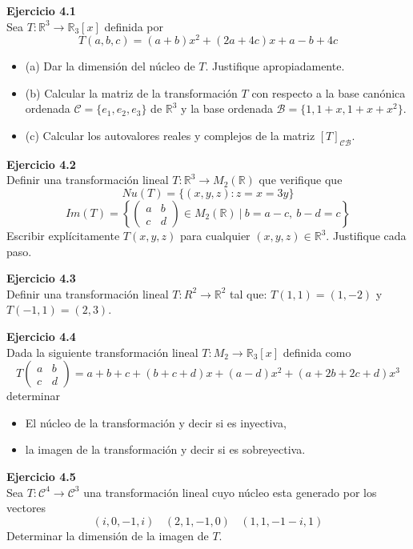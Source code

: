 \documentclass{article}
\newenvironment{problem}[2][Ejercicio]
    { \begin{mdframed}[backgroundcolor=gray!20] \textbf{#1 #2} \\}
    {  \end{mdframed}}
\begin{document}
\begin{problem}{4.1}
    Sea $T : \mathbb{R}^3 \to \mathbb{R}_3[x]$ definida por
\[
T(a,b,c) = (a+b)x^2+(2a+4c)x+a-b+4c
\]\begin{itemize}
\item 
(a) Dar la dimensión del núcleo de $T$. Justifique apropiadamente.
\item 
(b) Calcular la matriz de la transformación $T$ con respecto a la base canónica ordenada $\mathcal{C}= \{ e_1,e_2,e_3\}$ de $\mathbb{R}^3$ y la base ordenada $\mathcal{B} = \{1,1+x,1+x+x^2\}$.
\item 
(c) Calcular los autovalores reales y complejos de la matriz $[T]_{\mathcal{CB}}$.
\end{itemize}
\end{problem}
\begin{problem}{4.2}
    Definir una transformación lineal $T:\mathbb{R}^3 \to M_2(\mathbb{R})$ que verifique que
\[
Nu(T) = \{ (x,y,z) : z = x = 3y \}
\]\[
Im(T) = \left \{  \begin{pmatrix} a & b \\ c & d \end{pmatrix}  \in M_2(\mathbb{R}) \ | \ b=a-c, \ b-d = c \right \}
\]
Escribir explícitamente $T(x,y,z)$ para cualquier $(x,y,z) \in \mathbb{R}^3$. Justifique cada paso.
\end{problem}
\begin{problem}{4.3}
    Definir una transformación lineal $T : R^2 \to \mathbb{R}^2$ tal que: $T(1, 1) = (1, -2)$ y $T(-1, 1) = (2, 3)$.
\end{problem}

\begin{problem}{4.4}
    Dada la siguiente transformación lineal $T : M_2 \to \mathbb{R}_3[x]$ definida como
\[
T  \begin{pmatrix} a & b \\ c & d \end{pmatrix} = 
a+b+c+(b+c+d)x+(a-d)x^2+(a+2b+2c+d)x^3
\]
determinar
\begin{itemize}
\item 
El núcleo de la transformación y decir si es inyectiva,
\item 
la imagen de la transformación y decir si es sobreyectiva.
\end{itemize}
\end{problem}
\newpage
\begin{problem}{4.5}
    Sea $T:\mathcal{C}^4 \to \mathcal{C}^3$ una transformación lineal cuyo núcleo esta generado por los vectores
\[
(i,0,-1,i) \ \ \ \ (2,1,-1,0) \ \ \ \ (1,1,-1-i,1)
\]
Determinar la dimensión de la imagen de $T$.
\end{problem}
\end{document}

